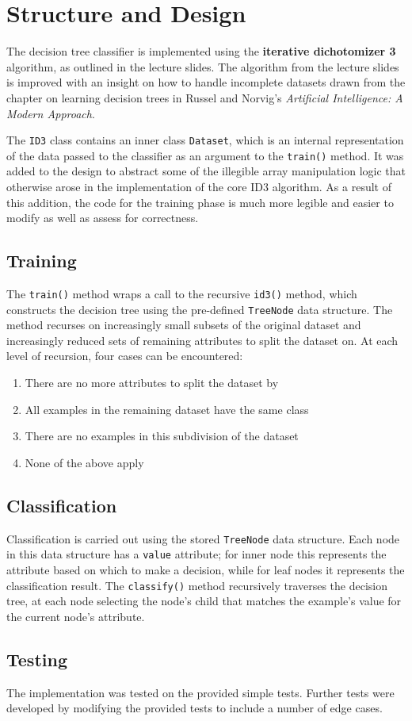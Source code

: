 \documentclass[10pt, titlepage]{article}
\begin{document}
\section{Structure and Design}
The decision tree classifier is implemented using the \textbf{iterative dichotomizer 3} algorithm, as outlined in the lecture slides. The algorithm from the lecture slides is improved with an insight on how to handle incomplete datasets drawn from the chapter on learning decision trees in Russel and Norvig's \textit{Artificial Intelligence: A Modern Approach}.

The \texttt{ID3} class contains an inner class \texttt{Dataset}, which is an internal representation of the data passed to the classifier as an argument to the \texttt{train()} method. It was added to the design to abstract some of the illegible array manipulation logic that otherwise arose in the implementation of the core ID3 algorithm. As a result of this addition, the code for the training phase is much more legible and easier to modify as well as assess for correctness.


\subsection{Training}
The \texttt{train()} method wraps a call to the recursive \texttt{id3()} method, which constructs the decision tree using the pre-defined \texttt{TreeNode} data structure. The method recurses on increasingly small subsets of the original dataset and increasingly reduced sets of remaining attributes to split the dataset on. At each level of recursion, four cases can be encountered:

\begin{enumerate}
\item There are no more attributes to split the dataset by
\item All examples in the remaining dataset have the same class
\item There are no examples in this subdivision of the dataset
\item None of the above apply
\end{enumerate}


\subsection{Classification}
Classification is carried out using the stored \texttt{TreeNode} data structure. Each node in this data structure has a \texttt{value} attribute; for inner node this represents the attribute based on which to make a decision, while for leaf nodes it represents the classification result. The \texttt{classify()} method recursively traverses the decision tree, at each node selecting the node's child that matches the example's value for the current node's attribute.

\subsection{Testing}
The implementation was tested on the provided simple tests. Further tests were developed by modifying the provided tests to include a number of edge cases.
\end{document}
